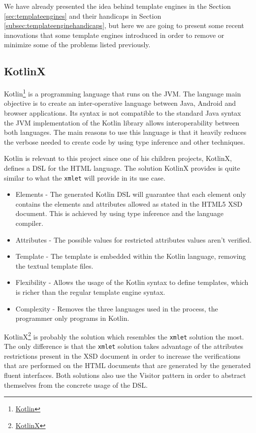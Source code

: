 We have already presented the idea behind template engines in the Section \ref{sec:templateengines} and their handicaps in Section  \ref{subsec:templateenginehandicaps}, but here we are going to present some recent innovations that some template engines introduced in order to remove or minimize some of the problems listed previously.

\subsection{KotlinX}
\label{sec:kotlinx}

Kotlin\footnote{\href{https://kotlinlang.org/}{Kotlin}} is a programming language that runs on the \ac{JVM}. The language main objective is to create an inter-operative language between Java, Android and browser applications. Its syntax is not compatible to the standard Java syntax the \ac{JVM} implementation of the Kotlin library allows interoperability between both languages. The main reasons to use this language is that it heavily reduces the verbose needed to create code by using type inference and other techniques. 

\noindent
Kotlin is relevant to this project since one of his children projects, KotlinX, defines a \ac{DSL} for the \ac{HTML} language. The solution KotlinX provides is quite similar to what the \texttt{xmlet} will provide in its use case. 

\begin{itemize}
	\item Elements - The generated Kotlin \ac{DSL} will guarantee that each element only contains the elements and attributes allowed as stated in the \ac{HTML}5 \ac{XSD} document. This is achieved by using type inference and the language compiler.
	\item Attributes - The possible values for restricted attributes values aren't verified.
	\item Template - The template is embedded within the Kotlin language, removing the textual template files.
	\item Flexibility - Allows the usage of the Kotlin syntax to define templates, which is richer than the regular template engine syntax.
	\item Complexity - Removes the three languages used in the process, the programmer only programs in Kotlin.
\end{itemize}

\noindent
KotlinX\footnote{\href{https://github.com/Kotlin/kotlinx.coroutines}{KotlinX}} is probably the solution which resembles the \texttt{xmlet} solution the most. The only difference is that the \texttt{xmlet} solution takes advantage of the attributes restrictions present in the \ac{XSD} document in order to increase the verifications that are performed on the \ac{HTML} documents that are generated by the generated fluent interfaces. Both solutions also use the Visitor pattern in order to abstract themselves from the concrete usage of the \ac{DSL}.

